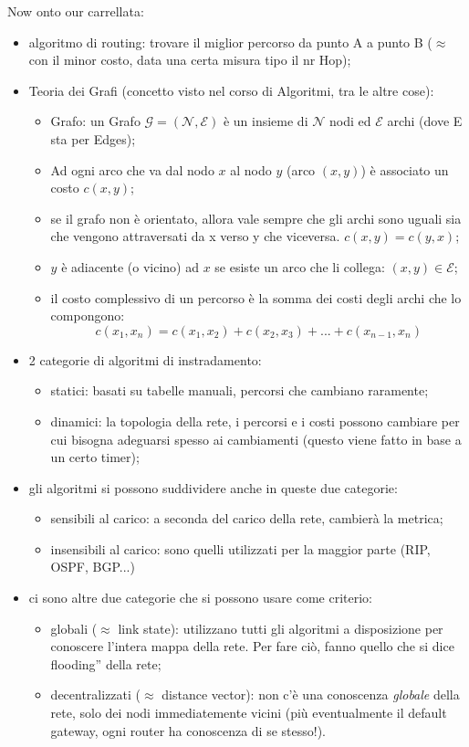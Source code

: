 \noindent Now onto our carrellata:
\begin{itemize}
    \item algoritmo di routing: trovare il miglior percorso da punto A a punto B ($\approx$ con il minor costo, data una certa misura tipo il nr Hop);
    \item Teoria dei Grafi (concetto visto nel corso di Algoritmi, tra le altre cose):
    \begin{itemize}
        \item Grafo: un Grafo $\mathcal{G}=(\mathcal{N},\mathcal{E})$ è un insieme di $\mathcal{N}$ nodi ed $\mathcal{E}$ archi (dove E sta per Edges);
        \item Ad ogni arco che va dal nodo $x$ al nodo $y$ (arco $(x,y)$) è associato un costo $c(x,y)$;
        \item se il grafo non è orientato, allora vale sempre che gli archi sono uguali sia che vengono attraversati da x verso y che viceversa. $c(x,y) = c(y,x)$;
        \item $y$ è adiacente (o vicino) ad $x$ se esiste un arco che li collega: $(x,y)\in \mathcal{E}$;
        \item il costo complessivo di un percorso è la somma dei costi degli archi che lo compongono:
        \[c(x_1,x_n) = c(x_1,x_2)+c(x_2, x_3) +...+c(x_{n-1}, x_n)\]
    \end{itemize}
    \item 2 categorie di algoritmi di instradamento:
    \begin{itemize}
        \item statici: basati su tabelle manuali, percorsi che cambiano raramente;
        \item dinamici: la topologia della rete, i percorsi e i costi possono cambiare per cui bisogna adeguarsi spesso ai cambiamenti (questo viene fatto in base a un certo timer);
    \end{itemize}
    \item gli algoritmi si possono suddividere anche in queste due categorie:
    \begin{itemize}
    \item sensibili al carico: a seconda del carico della rete, cambierà la metrica;
    \item insensibili al carico: sono quelli utilizzati per la maggior parte (RIP, OSPF, BGP...)
    \end{itemize}
    \item ci sono altre due categorie che si possono usare come criterio:
    \begin{itemize}
        \item globali ($\approx$ link state): utilizzano tutti gli algoritmi a disposizione per conoscere l'intera mappa della rete. Per fare ciò, fanno quello che si dice \openapex flooding'' della rete;
        \item decentralizzati ($\approx$ distance vector): non c'è una conoscenza \textit{globale} della rete, solo dei nodi immediatemente vicini (più eventualmente il default gateway, ogni router ha conoscenza di se stesso!).
    \end{itemize}
\end{itemize}

